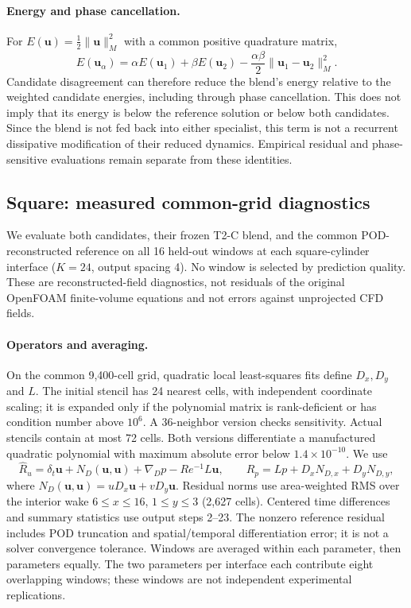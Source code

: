 \paragraph{Energy and phase cancellation.}
For $E(\bm u)=\tfrac12\|\bm u\|_M^2$ with a common positive quadrature matrix,
\begin{equation}
E(\bm u_\alpha)=\alpha E(\bm u_1)+\beta E(\bm u_2)
-\frac{\alpha\beta}{2}\|\bm u_1-\bm u_2\|_M^2.
\end{equation}
Candidate disagreement can therefore reduce the blend's energy relative to the weighted candidate energies, including through phase cancellation. This does not imply that its energy is below the reference solution or below both candidates. Since the blend is not fed back into either specialist, this term is not a recurrent dissipative modification of their reduced dynamics. Empirical residual and phase-sensitive evaluations remain separate from these identities.

\subsection{Square: measured common-grid diagnostics}
\label{app:fusion_measured}
We evaluate both candidates, their frozen T2-C blend, and the common
POD-reconstructed reference on all 16 held-out windows at each square-cylinder
interface ($K=24$, output spacing 4). No window is selected by prediction
quality. These are reconstructed-field diagnostics, not residuals of the
original OpenFOAM finite-volume equations and not errors against unprojected
CFD fields.

\paragraph{Operators and averaging.}
On the common 9,400-cell grid, quadratic local least-squares fits define
$D_x,D_y$ and $L$. The initial stencil has 24 nearest cells, with independent
coordinate scaling; it is expanded only if the polynomial matrix is
rank-deficient or has condition number above $10^6$. A 36-neighbor version
checks sensitivity. Actual stencils contain at most 72 cells. Both versions
differentiate a manufactured quadratic polynomial with maximum absolute
error below $1.4\times10^{-10}$. We use
\begin{equation}
\widehat R_u=\delta_t\bm u+N_D(\bm u,\bm u)+\nabla_Dp-Re^{-1}L\bm u,
\qquad
\widehat R_p=Lp+D_xN_{D,x}+D_yN_{D,y},
\end{equation}
where $N_D(\bm u,\bm u)=uD_x\bm u+vD_y\bm u$.
Residual norms use area-weighted RMS over the interior wake
$6\leq x\leq16$, $1\leq y\leq3$ (2,627 cells).
Centered time differences and summary statistics use output steps 2--23.
The nonzero reference residual includes POD truncation and spatial/temporal
differentiation error; it is not a solver convergence tolerance. Windows
are averaged within each parameter, then parameters equally. The two
parameters per interface each contribute eight overlapping windows;
these windows are not independent experimental replications.

